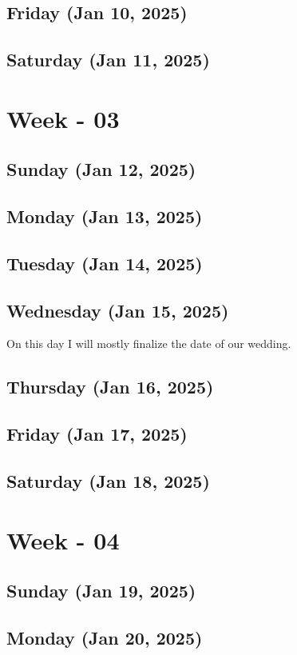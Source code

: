 \subsection*{Friday (Jan 10, 2025)}
\subsection*{Saturday (Jan 11, 2025)}

\section{Week - 03}
\subsection*{Sunday (Jan 12, 2025)}
\subsection*{Monday (Jan 13, 2025)}
\subsection*{Tuesday (Jan 14, 2025)}
\subsection*{Wednesday (Jan 15, 2025)}
\hspace{1cm}On this day I will mostly finalize the date of our wedding. 
\subsection*{Thursday (Jan 16, 2025)}
\subsection*{Friday (Jan 17, 2025)}
\subsection*{Saturday (Jan 18, 2025)}

\section{Week - 04}
\subsection*{Sunday (Jan 19, 2025)}
\subsection*{Monday (Jan 20, 2025)}
